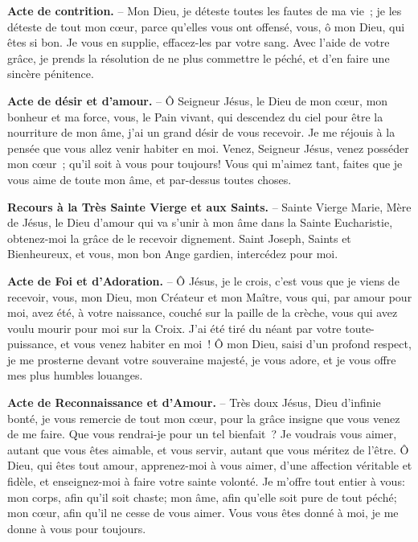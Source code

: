 \textbf{Acte de contrition.} – Mon Dieu, je déteste toutes les fautes de ma vie~; je les déteste de tout mon cœur, parce qu’elles vous ont offensé, vous, ô mon Dieu, qui êtes si bon. Je vous en supplie, effacez-les par votre sang. Avec l’aide de votre grâce, je prends la résolution de ne plus commettre le péché, et d’en faire une sincère pénitence.

\textbf{Acte de désir et d’amour.} – Ô Seigneur Jésus, le Dieu de mon cœur, mon bonheur et ma force, vous, le Pain vivant, qui descendez du ciel pour être la nourriture de mon âme, j’ai un grand désir de vous recevoir. Je me réjouis à la pensée que vous allez venir habiter en moi. Venez, Seigneur Jésus, venez posséder mon cœur~; qu’il soit à vous pour toujours! Vous qui m’aimez tant, faites que je vous aime de toute mon âme, et par-dessus toutes choses.

\textbf{Recours à la Très Sainte Vierge et aux Saints.} – Sainte Vierge Marie, Mère de Jésus, le Dieu d’amour qui va s’unir à mon âme dans la Sainte Eucharistie, obtenez-moi la grâce de le recevoir dignement. Saint Joseph, Saints et Bienheureux, et vous, mon bon Ange gardien, intercédez pour moi.\par\vspace{0.2cm}
\begin{center}\end{center}

\textbf{Acte de Foi et d’Adoration.} – Ô Jésus, je le crois, c’est vous que je viens de recevoir, vous, mon Dieu, mon Créateur et mon Maître, vous qui, par amour pour moi, avez été, à votre naissance, couché sur la paille de la crèche, vous qui avez voulu mourir pour moi sur la Croix. J’ai été tiré du néant par votre toute-puissance, et vous venez habiter en moi~! Ô mon Dieu, saisi d’un profond respect, je me prosterne devant votre souveraine majesté, je vous adore, et je vous offre mes plus humbles louanges.

\textbf{Acte de Reconnaissance et d’Amour.} – Très doux Jésus, Dieu d’infinie bonté, je vous remercie de tout mon cœur, pour la grâce insigne que vous venez de me faire. Que vous rendrai-je pour un tel bienfait~? Je voudrais vous aimer, autant que vous êtes aimable, et vous servir, autant que vous méritez de l’être. Ô Dieu, qui êtes tout amour, apprenez-moi à vous aimer, d’une affection véritable et fidèle, et enseignez-moi à faire votre sainte volonté. Je m’offre tout entier à vous: mon corps, afin qu’il soit chaste; mon âme, afin qu’elle soit pure de tout péché; mon cœur, afin qu’il ne cesse de vous aimer. Vous vous êtes donné à moi, je me donne à vous pour toujours.

